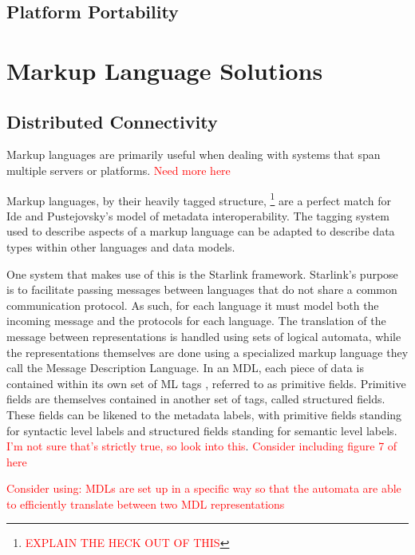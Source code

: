 \documentclass{sig-alternate}
\newcommand{\mycomment}[1]{\textcolor{red}{#1}}
\begin{document}
\subsection*{Platform Portability}


\section{Markup Language Solutions}\label{ML}



\subsection*{Distributed Connectivity}
Markup languages are primarily useful when dealing with systems that span multiple servers or platforms. \mycomment{Need more here}

Markup languages, by their heavily tagged structure, \footnote{\mycomment{EXPLAIN THE HECK OUT OF THIS}} are a perfect match for Ide and Pustejovsky's model of metadata interoperability.\cite{Ide:2010} The tagging system used to describe aspects of a markup language can be adapted to describe data types within other languages and data models.

One system that makes use of this is the Starlink framework\cite{Bromberg:2011}. Starlink's purpose is to facilitate passing messages between languages that do not share a common communication protocol. As such, for each language it must model both the incoming message and the protocols for each language.
The translation of the message between representations is handled using sets of logical automata, while the representations themselves are done using a specialized markup language they call the Message Description Language. In an MDL, each piece of data is contained within its own set of ML tags , referred to as primitive fields. Primitive fields are themselves contained in another set of tags, called structured fields. These fields can be likened to the metadata labels, with primitive fields standing for syntactic level labels and structured fields standing for semantic level labels. \mycomment{I'm not sure that's strictly true, so look into this}.
\mycomment{Consider including figure 7 of \cite{Bromberg:2011} here}

\mycomment{Consider using: MDLs are set up in a specific way so that the automata are able to efficiently translate between two MDL representations}

\end{document}
